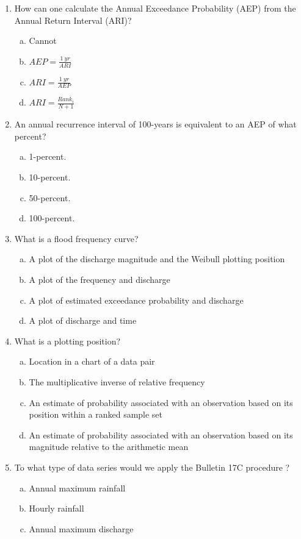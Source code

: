 \documentclass[12pt]{article}
\begin{document}
\begin{enumerate}
\item How can one calculate the Annual Exceedance Probability (AEP) from the Annual Return Interval (ARI)?
\begin{enumerate}[a)]
\item	Cannot
\item	$AEP = \frac{1~yr}{ARI}$
\item	$ARI = \frac{1~yr}{AEP}$
\item	$ARI = \frac{Rank_i}{N+1}$
\end{enumerate}
\item An annual recurrence interval of 100-years is equivalent to an AEP of what percent?
\begin{enumerate}[a)]
\item 1-percent.
\item 10-percent.
\item 50-percent.
\item 100-percent.
\end{enumerate}
\item What is a flood frequency curve?
\begin{enumerate}[a)]
\item A plot of the discharge magnitude and the Weibull plotting position
\item A plot of the frequency and discharge
\item A plot of estimated exceedance probability and discharge
\item A plot of discharge and time
\end{enumerate}
\item What is a plotting position?
\begin{enumerate}[a)]
\item Location in a chart of a data pair
\item The multiplicative inverse of relative frequency
\item An estimate of probability associated with an observation based on its position within a ranked sample set
\item An estimate of probability associated with an observation based on its magnitude relative to the arithmetic mean
\end{enumerate}
\item To what type of data series would we apply the Bulletin 17C procedure ?
\begin{enumerate}[a)]
\item Annual maximum rainfall
\item Hourly rainfall
\item Annual maximum discharge

\end{enumerate}
\end{enumerate}
\end{document}
